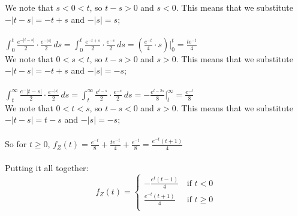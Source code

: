 \documentclass{article}
\begin{document}
{We note that $s < 0 < t$, so $t - s > 0$ and $s < 0$. This means that we substitute $-|t-s| = -t+s$ and $-|s| = s$;  \\ \\ 
$\int_{0}^{t} \frac{e^{-|t-s|}}{2} \cdot \frac{e^{-|s|}}{2} \,ds = \int_{0}^{t} \frac{e^{-t+s}}{2} \cdot \frac{e^{-s}}{2} \,ds = (\frac{e^{-t}}{4} \cdot s) |_{0}^{t} = \frac{te^{-t}}{4}$ \\ 
We note that $0 < s < t$, so $t - s > 0$ and $s > 0$. This means that we substitute $-|t-s| = -t + s$ and $-|s| = -s$;  \\ \\
$\int_{t}^{\infty} \frac{e^-{|t-s|}}{2} \cdot \frac{e^{-|s|}}{2} \,ds = \int_{t}^{\infty} \frac{e^{t-s}}{2} \cdot \frac{e^{-s}}{2} \,ds = -\frac{e^{t - 2s}}{8} |_{t}^{\infty} = \frac{e^{-t}}{8}$ \\ 
We note that $0 < t < s$, so $t - s < 0$ and $s > 0$. This means that we substitute $-|t-s| = t - s$ and $-|s| = -s$;  \\ \\
So for $t \geq 0$, $f_Z(t) = \frac{e^{-t}}{8} + \frac{te^{-t}}{4} + \frac{e^{-t}}{8} = \frac{e^{-t}(t+1)}{4}$ \\ \\ 
Putting it all together: \\ 
\[
f_{Z}\left(t\right)=\begin{cases}
-\frac{e^t(t - 1)}{4}& \,\mbox{if } t < 0\\
\frac{e^{-t}(t+1)}{4}& \,\mbox{if } t \geq 0\\
\end{cases}
\]

}
\end{document}
